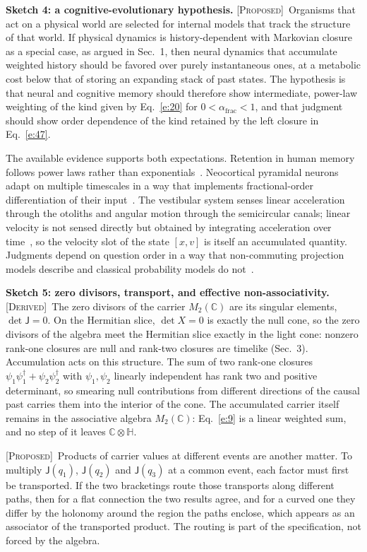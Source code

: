 \documentclass[10pt]{article}
\newcommand{\sJ}{\mathsf{J}}
\newcommand{\afrac}{\alpha_{\mathrm{frac}}}
\newcommand{\Derived}{\noindent\textsc{[Derived]}\ }
\newcommand{\Proposed}{\noindent\textsc{[Proposed]}\ }
\begin{document}
\noindent\textbf{Sketch 4: a cognitive-evolutionary hypothesis.} \Proposed Organisms that act on a physical world are selected for internal models that track the structure of that world. If physical dynamics is history-dependent with Markovian closure as a special case, as argued in Sec.~1, then neural dynamics that accumulate weighted history should be favored over purely instantaneous ones, at a metabolic cost below that of storing an expanding stack of past states. The hypothesis is that neural and cognitive memory should therefore show intermediate, power-law weighting of the kind given by Eq.~\eqref{e:20} for $0<\afrac<1$, and that judgment should show order dependence of the kind retained by the left closure in Eq.~\eqref{e:47}.

The available evidence supports both expectations. Retention in human memory follows power laws rather than exponentials~\cite{wixted}. Neocortical pyramidal neurons adapt on multiple timescales in a way that implements fractional-order differentiation of their input~\cite{lundstrom}. The vestibular system senses linear acceleration through the otoliths and angular motion through the semicircular canals; linear velocity is not sensed directly but obtained by integrating acceleration over time~\cite{angelaki}, so the velocity slot of the state $[x,v]$ is itself an accumulated quantity. Judgments depend on question order in a way that non-commuting projection models describe and classical probability models do not~\cite{wangqo,busemeyer}.

\noindent\textbf{Sketch 5: zero divisors, transport, and effective non-associativity.} \Derived The zero divisors of the carrier $M_2(\mathbb C)$ are its singular elements, $\det\sJ=0$. On the Hermitian slice, $\det X=0$ is exactly the null cone, so the zero divisors of the algebra meet the Hermitian slice exactly in the light cone: nonzero rank-one closures are null and rank-two closures are timelike (Sec.~3). Accumulation acts on this structure. The sum of two rank-one closures $\psi_1\psi_1^\dagger+\psi_2\psi_2^\dagger$ with $\psi_1,\psi_2$ linearly independent has rank two and positive determinant, so smearing null contributions from different directions of the causal past carries them into the interior of the cone. The accumulated carrier itself remains in the associative algebra $M_2(\mathbb C)$: Eq.~\eqref{e:9} is a linear weighted sum, and no step of it leaves $\mathbb C\otimes\mathbb H$.

\Proposed Products of carrier values at different events are another matter. To multiply $\sJ(q_1)$, $\sJ(q_2)$ and $\sJ(q_3)$ at a common event, each factor must first be transported. If the two bracketings route those transports along different paths, then for a flat connection the two results agree, and for a curved one they differ by the holonomy around the region the paths enclose, which appears as an associator of the transported product. The routing is part of the specification, not forced by the algebra.
\end{document}
